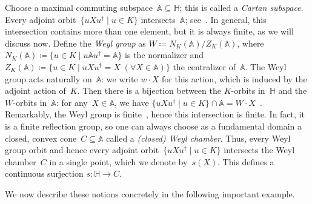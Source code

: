 \documentclass[11pt,letterpaper]{article}
\numberwithin{equation}{section}
\renewcommand{\AA}{\mathbb{A}}
\newcommand{\bbH}{\mathbb{H}}
\begin{document}
Choose a maximal commuting subspace~$\AA\subseteq\bbH$; %
this is called a \emph{Cartan subspace}.
Every adjoint orbit~$\{uXu^\dagger\mid u\in K\}$ intersects~$\AA$; see~\cite[Cor.~2.20]{Wallach2017}.
In general, this intersection contains more than one element, but it is always finite, as we will discuss now.
Define the \emph{Weyl group} as $W\coloneqq N_K(\AA)/Z_K(\AA)$, where $N_K(\AA)\coloneqq \{u\in K\mid u\AA u^\dagger=\AA\}$ is the normalizer and $Z_K(\AA)\coloneqq \{u\in K\mid uXu^\dagger=X \; (\forall X\in\AA)\}$ the centralizer of~$\AA$.
The Weyl group acts naturally on~$\AA$: we write $w \cdot X$ for this action, which is induced by the adjoint action of~$K$.
Then there is a bijection between the $K$-orbits in~$\bbH$ and the $W$-orbits in~$\AA$:
for any~$X \in \AA$, we have $\{u X u^\dagger \mid u \in K \} \cap \AA = W \cdot X$~\cite[Prop.~3.61]{Wallach2017}.
Remarkably, the Weyl group is finite~\cite[Cor.~3.60]{Wallach2017}, hence this intersection is finite.
In fact, it is a finite reflection group, so one can always choose as a fundamental domain a closed, convex cone~$C\subseteq\AA$ called a \emph{(closed) Weyl chamber}.
Thus, every Weyl group orbit and hence every adjoint orbit~$\{u Xu^\dagger \mid u \in K\}$ intersects the Weyl chamber~$C$ in a single point, which we denote by~$s(X)$.
This defines a continuous surjection $s\colon\bbH\rightarrow C$.



We now describe these notions concretely in the following important example.
\end{document}
